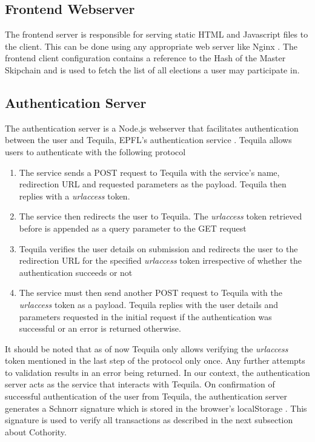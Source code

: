 \subsection{Frontend Webserver}
The frontend server is responsible for serving static HTML and Javascript files to the client. This can be done using any appropriate web server like Nginx \cite{nginx}. The frontend client configuration contains a reference to the Hash of the Master Skipchain and is used to fetch the list of all elections a user may participate in.

\subsection{Authentication Server}
The authentication server is a Node.js \cite{nodejs} webserver that facilitates authentication between the user and Tequila, EPFL’s authentication service \cite{tequila}. Tequila allows users to authenticate with the following protocol

\begin{enumerate}
  \item The service sends a POST request to Tequila with the service’s name, redirection URL and requested parameters as the payload. Tequila then replies with a \textit{urlaccess} token.
  \item The service then redirects the user to Tequila. The \textit{urlaccess} token retrieved before is appended as a query parameter to the GET request
  \item Tequila verifies the user details on submission and redirects the user to the redirection URL for the specified \textit{urlaccess} token irrespective of whether the authentication succeeds or not
  \item The service must then send another POST request to Tequila with the \textit{urlaccess} token as a payload. Tequila replies with the user details and parameters requested in the initial request if the authentication was successful or an error is returned otherwise.
\end{enumerate}

It should be noted that as of now Tequila only allows verifying the \textit{urlaccess} token mentioned in the last step of the protocol only once. Any further attempts to validation results in an error being returned. In our context, the authentication server acts as the service that interacts with Tequila. On confirmation of successful authentication of the user from Tequila, the authentication server generates a Schnorr signature which is stored in the browser’s localStorage \cite{localStorage}. This signature is used to verify all transactions as described in the next subsection about Cothority.

